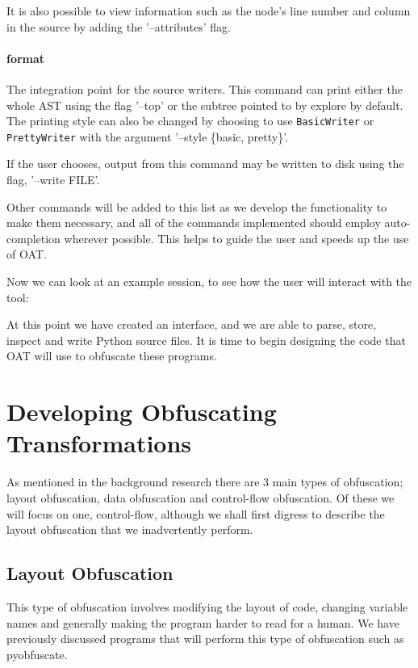 \documentclass[twoside,a4paper]{report}
\begin{document}
It is also possible to view information such as the node's line number and column in the source by adding the '--attributes' flag.

\paragraph{format}

The integration point for the source writers. This command can print either the whole AST using the flag '--top' or the subtree pointed
to by explore by default. The printing style can also be changed by choosing to use \texttt{BasicWriter} or \texttt{PrettyWriter} with
the argument '--style \{basic, pretty\}'.

If the user chooses, output from this command may be written to disk using the flag, '--write FILE'.

Other commands will be added to this list as we develop the functionality to make them necessary, and all of the commands implemented
should employ auto-completion wherever possible. This helps to guide the user and speeds up the use of OAT.

Now we can look at an example session, to see how the user will interact with the tool:



At this point we have created an interface, and we are able to parse, store, inspect and write Python source
files. It is time to begin designing the code that OAT will use to obfuscate these programs.

\section{Developing Obfuscating Transformations}

As mentioned in the background research there are 3 main types of obfuscation; layout obfuscation, data
obfuscation and control-flow obfuscation. Of these we will focus on one, control-flow, although we shall
first digress to describe the layout obfuscation that we inadvertently perform.

\subsection{Layout Obfuscation}

This type of obfuscation involves modifying the layout of code, changing variable names and
generally making the program harder to read for a human. We have previously discussed programs that will
perform this type of obfuscation such as pyobfuscate.
\end{document}
